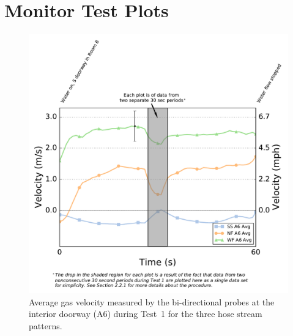 \documentclass[12pt,oneside]{book}
\begin{document}
\chapter{Monitor Test Plots}
\label{chap:monitor_plots}

\begin{figure}[!ht]
	\includegraphics[width=\columnwidth]{../Figures/Plots/HOSE_IXXAXX_BDP_A6_stream_avgs}
	\caption[Average gas velocity through the interior doorway during Test~1 for the three hose stream patterns.]{Average gas velocity measured by the bi-directional probes at the interior doorway (A6) during Test~1 for the three hose stream patterns.}
	\label{fig:Test_1_BDP_A6_Avg_All}
\end{figure}
\FloatBarrier
\end{document}
